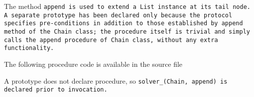 The method \tt{append} is used to extend a \tt{List} instance at its tail node.
A separate prototype has been declared only because the protocol specifies
pre-conditions in addition to those established by \tt{append} method of
the \tt{Chain} class; the procedure itself is trivial and simply calls the
\tt{append} procedure of \tt{Chain} class, without any extra functionality.

The following procedure code is available in the source file

\note A prototype does not declare procedure, so
\tt{solver_(Chain, append)} is declared prior to invocation.
